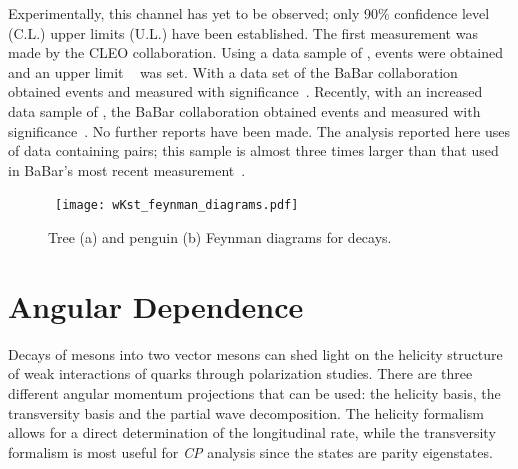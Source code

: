 

Experimentally, this channel has yet to be observed; only 90\% confidence level (C.L.) upper limits (U.L.) have been established. The first measurement was made by the CLEO collaboration. Using a data sample of \DataSetCLEO, \YieldCLEO events were obtained and an upper limit \BrCLEO~\cite{CLEO_wKstz} was set. With a data set of \DataSetBabarOld the BaBar collaboration obtained \YieldBabarOld events and measured \BrBabarOld with \SigBabarOld significance~\cite{babar_wKstz_1}. Recently, with an increased data sample of \DataSetBABAR, the BaBar collaboration obtained \YieldBabar events and measured \BrBabar with \SigBabar significance~\cite{babar_wKstz_2}. No further reports have been made. The analysis reported here uses \dataset of data containing \NBBbarVal \BBbar pairs; this sample is almost three times larger than that used in BaBar's most recent measurement~\cite{babar_wKstz_2}.


\begin{figure}[h]
\centerline{
\hbox{
\texttt{[image: wKst\_feynman\_diagrams.pdf]}\hspace{0.2cm} }}
\caption{Tree (a) and penguin (b) Feynman diagrams for \BzToOmeKstz decays. \label{wKst_feynman_diagrams}}
\vskip -0.2cm
\end{figure}

\section{Angular Dependence \label{pol th}}
Decays of \B mesons into two vector mesons can shed light on the helicity structure of weak interactions of quarks through polarization studies. There are three different angular momentum projections that can be used: the helicity basis, the transversity basis and the partial wave decomposition. The helicity formalism allows for a direct determination of the longitudinal rate, while the transversity formalism is most useful for \textit{CP} analysis since the states are parity eigenstates. 

